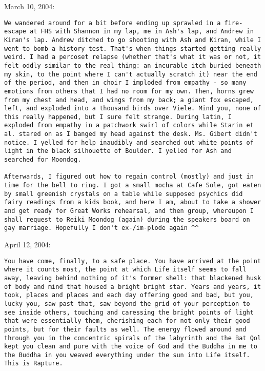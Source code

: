 March 10, 2004:

\begin{verbatim}
We wandered around for a bit before ending up sprawled in a fire-escape at FHS with Shannon in my lap, me in Ash's lap, and Andrew in Kiran's lap. Andrew ditched to go shooting with Ash and Kiran, while I went to bomb a history test. That's when things started getting really weird. I had a percoset relapse (whether that's what it was or not, it felt oddly similar to the real thing: an incurable itch buried beneath my skin, to the point where I can't actually scratch it) near the end of the period, and then in choir I imploded from empathy - so many emotions from others that I had no room for my own. Then, horns grew from my chest and head, and wings from my back; a giant fox escaped, left, and exploded into a thousand birds over Viele. Mind you, none of this really happened, but I sure felt strange. During latin, I exploded from empathy in a patchwork swirl of colors while Starin et al. stared on as I banged my head against the desk. Ms. Gibert didn't notice. I yelled for help inaudibly and searched out white points of light in the black silhouette of Boulder. I yelled for Ash and searched for Moondog.

Afterwards, I figured out how to regain control (mostly) and just in time for the bell to ring. I got a small mocha at Cafe Sole, got eaten by small greenish crystals on a table while supposed psychics did fairy readings from a kids book, and here I am, about to take a shower and get ready for Great Works rehearsal, and then group, whereupon I shall request to Reiki Moondog (again) during the speakers board on gay marriage. Hopefully I don't ex-/im-plode again ^^
\end{verbatim}

April 12, 2004:

\begin{verbatim}
You have come, finally, to a safe place. You have arrived at the point where it counts most, the point at which Life itself seems to fall away, leaving behind nothing of it's former shell: that blackened husk of body and mind that housed a bright bright star. Years and years, it took, places and places and each day offering good and bad, but you, lucky you, saw past that, saw beyond the grid of your perception to see inside others, touching and caressing the bright points of light that were essentially them, cherishing each for not only their good points, but for their faults as well. The energy flowed around and through you in the concentric spirals of the labyrinth and the Bat Qol kept you clean and pure with the voice of God and the Buddha in me to the Buddha in you weaved everything under the sun into Life itself. This is Rapture.
\end{verbatim}

